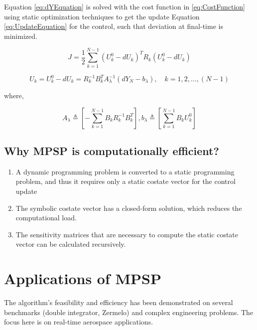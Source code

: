 \documentclass[12pt]{article}
\begin{document}
Equation \ref{eq:dYEquation} is solved with the cost function in \ref{eq:CostFunction} using static optimization techniques to get the update Equation \ref{eq:UpdateEquation} for the control, such that deviation at final-time is minimized.

\begin{equation}J=\frac{1}{2} \sum_{k=1}^{N-1}\left(U_{k}^{0}-d U_{k}\right)^{T} R_{k}\left(U_{k}^{0}-d U_{k}\right)
\label{eq:CostFunction}
\end{equation}

\begin{equation}U_{k}=U_{k}^{0}-d U_{k}=R_{k}^{-1} B_{k}^{T} A_{\lambda}^{-1}\left(d Y_{N}-b_{\lambda}\right), \quad k=1,2, \ldots,(N-1)
\label{eq:UpdateEquation}
\end{equation}

where,

\begin{equation}A_{\lambda} \triangleq\left[-\sum_{k=1}^{N-1} B_{k} R_{k}^{-1} B_{k}^{T}\right], b_{\lambda} \triangleq\left[\sum_{k=1}^{N-1} B_{k} U_{k}^{0}\right]
\end{equation}

\subsection{Why MPSP is computationally efficient?}
\begin{enumerate}
	\item A dynamic programming problem is converted to a static programming problem, and thus it requires only a static costate vector for the control update
	\item The symbolic costate vector has a closed-form solution, which reduces the computational load.
	\item The sensitivity matrices that are necessary to compute the static costate vector can be calculated recursively.
\end{enumerate}

\section{Applications of MPSP}
The algorithm's feasibility and efficiency has been demonstrated on several benchmarks (double integrator, Zermelo) and complex engineering problems. The focus here is on real-time aerospace applications.
\end{document}
